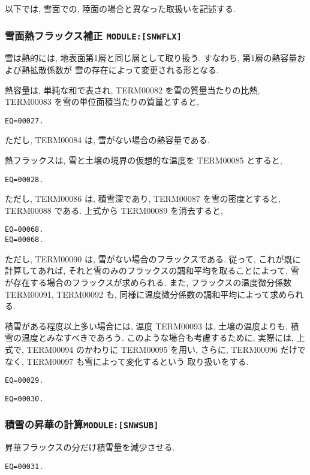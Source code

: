 \bigskip
以下では, 雪面での, 陸面の場合と異なった取扱いを記述する.
\bigskip

\subsubsection{雪面熱フラックス補正 \texttt{MODULE:[SNWFLX]}}


雪は熱的には, 地表面第1層と同じ層として取り扱う.
すなわち, 第1層の熱容量および熱拡散係数が
雪の存在によって変更される形となる.

熱容量は, 単純な和で表され,
TERM00082 を雪の質量当たりの比熱, TERM00083 を雪の単位面積当たりの質量とすると,
\begin{verbatim}
EQ=00027.
\end{verbatim}
ただし, TERM00084 は, 雪がない場合の熱容量である.

熱フラックスは, 雪と土壌の境界の仮想的な温度を TERM00085 とすると,
\begin{verbatim}
EQ=00028.
\end{verbatim}
ただし, TERM00086 は, 積雪深であり, 
TERM00087 を雪の密度とすると, TERM00088 である.
上式から TERM00089 を消去すると,
\begin{verbatim}
EQ=00068.
EQ=00068.
\end{verbatim}
ただし, TERM00090 は, 雪がない場合のフラックスである.
従って, これが既に計算してあれば,
それと雪のみのフラックスの調和平均を取ることによって,
雪が存在する場合のフラックスが求められる.
また, フラックスの温度微分係数 TERM00091, TERM00092
も, 同様に温度微分係数の調和平均によって求められる.

積雪がある程度以上多い場合には, 
温度 TERM00093 は, 土壌の温度よりも, 積雪の温度とみなすべきであろう.
このような場合も考慮するために, 実際には, 
上式で, TERM00094 のかわりに TERM00095 を用い, 
さらに, TERM00096 だけでなく, TERM00097 も雪によって変化するという
取り扱いをする.

\begin{verbatim}
EQ=00029.
\end{verbatim}
\begin{verbatim}
EQ=00030.
\end{verbatim}

\subsubsection{積雪の昇華の計算\texttt{MODULE:[SNWSUB]}}

昇華フラックスの分だけ積雪量を減少させる. 
\begin{verbatim}
EQ=00031.
\end{verbatim}

